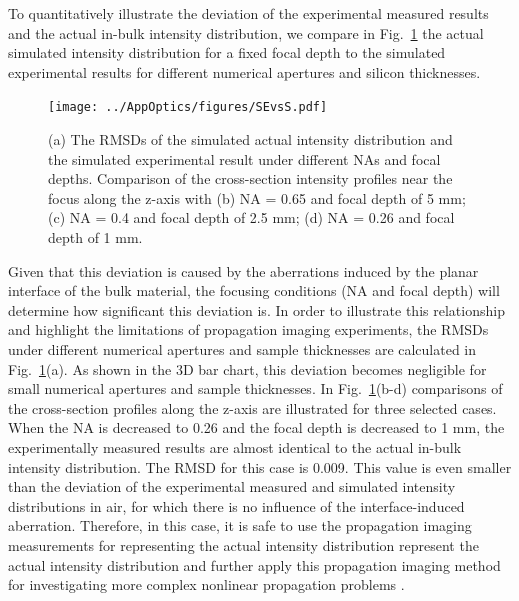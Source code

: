 \documentclass[9pt,twocolumn,twoside]{osajnl}
\begin{document}
To quantitatively illustrate the deviation of the experimental measured results and the actual in-bulk intensity distribution, we compare in Fig.~\ref{fig:6} the actual simulated intensity distribution for a fixed focal depth to the simulated experimental results for different numerical apertures and silicon thicknesses.

\begin{figure}[ht]
	\centering
	\texttt{[image: ../AppOptics/figures/SEvsS.pdf]}
	\caption{(a) The RMSDs of the simulated actual intensity distribution and the simulated experimental result under different NAs and focal depths. Comparison of the cross-section intensity profiles near the focus along the z-axis with (b) NA = 0.65 and focal depth of 5 mm; (c) NA = 0.4 and focal depth of 2.5 mm; (d) NA = 0.26 and focal depth of 1 mm.}\label{fig:6}
\end{figure}

Given that this deviation is caused by the aberrations induced by the planar interface of the bulk material, the focusing conditions (NA and focal depth) will determine how significant this deviation is. In order to illustrate this relationship and highlight the limitations of propagation imaging experiments, the RMSDs under different numerical apertures and sample thicknesses are calculated in Fig.~\ref{fig:6}(a). As shown in the 3D bar chart, this deviation becomes negligible for small numerical apertures and sample thicknesses. 
In Fig.~\ref{fig:6}(b-d) comparisons of the cross-section profiles along the z-axis are illustrated for three selected cases. When the NA is decreased to 0.26 and the focal depth is decreased to 1 mm, the experimentally measured results are almost identical to the actual in-bulk intensity distribution. The RMSD for this case is 0.009. This value is even smaller than the deviation of the experimental measured and simulated intensity distributions in air, for which there is no influence of the interface-induced aberration. Therefore, in this case, it is safe to use the propagation imaging measurements for representing the actual intensity distribution represent the actual intensity distribution and further apply this propagation imaging method for investigating more complex nonlinear propagation problems \cite{Chambonneau2020}.
\end{document}
